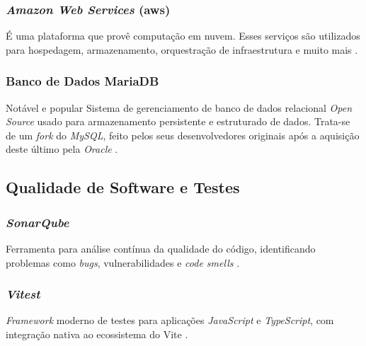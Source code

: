 \subsubsection{\emph{Amazon Web Services} (\gls{aws})} 
É uma plataforma que provê computação em nuvem. Esses serviços são utilizados para hospedagem, armazenamento, orquestração de infraestrutura e muito mais \cite{aws}.

\subsubsection{Banco de Dados MariaDB}
Notável e popular Sistema de gerenciamento de banco de dados relacional \emph{Open Source} usado para armazenamento persistente e estruturado de dados. Trata-se de um \emph{fork} do \emph{MySQL}, feito pelos seus desenvolvedores originais após a aquisição deste último pela \emph{Oracle} \cite{mariadb}.

\subsection{Qualidade de Software e Testes} 

\subsubsection{\emph{SonarQube}} 
Ferramenta para análise contínua da qualidade do código, identificando problemas como \emph{bugs}, vulnerabilidades e \emph{code smells} \cite{sonarqube}.

\subsubsection{\emph{Vitest}}
\emph{Framework} moderno de testes para aplicações \emph{JavaScript} e \emph{TypeScript}, com integração nativa ao ecossistema do Vite \cite{vitest-2025}.
